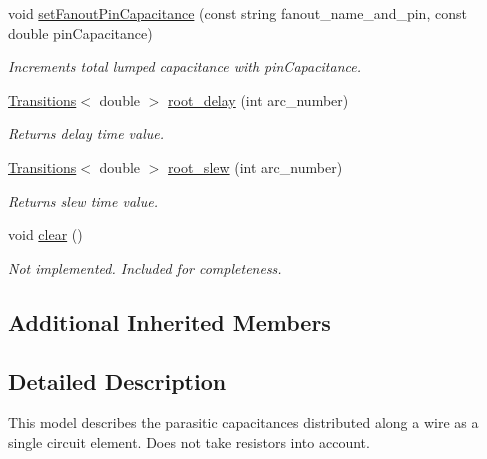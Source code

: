 \begin{DoxyCompactItemize}
void \hyperlink{classLumpedCapacitanceWireDelayModel_a888f7e6a4951837072b937ae30e93073}{set\-Fanout\-Pin\-Capacitance} (const string fanout\-\_\-name\-\_\-and\-\_\-pin, const double pin\-Capacitance)
\begin{DoxyCompactList}\small\item\em Increments total lumped capacitance with pin\-Capacitance. \end{DoxyCompactList}\item 
\hyperlink{classTransitions}{Transitions}$<$ double $>$ \hyperlink{classLumpedCapacitanceWireDelayModel_ab090355a74a21b5d6008352ff2a7d137}{root\-\_\-delay} (int arc\-\_\-number)
\begin{DoxyCompactList}\small\item\em Returns delay time value. \end{DoxyCompactList}\item 
\hyperlink{classTransitions}{Transitions}$<$ double $>$ \hyperlink{classLumpedCapacitanceWireDelayModel_a65e4141bbf97638c2334f71dfbf0ccfd}{root\-\_\-slew} (int arc\-\_\-number)
\begin{DoxyCompactList}\small\item\em Returns slew time value. \end{DoxyCompactList}\item 
void \hyperlink{classLumpedCapacitanceWireDelayModel_acca0415a76729b616be06543262ef441}{clear} ()
\begin{DoxyCompactList}\small\item\em Not implemented. Included for completeness. \end{DoxyCompactList}\end{DoxyCompactItemize}
\subsection*{Additional Inherited Members}


\subsection{Detailed Description}
This model describes the parasitic capacitances distributed along a wire as a single circuit element. Does not take resistors into account. 

